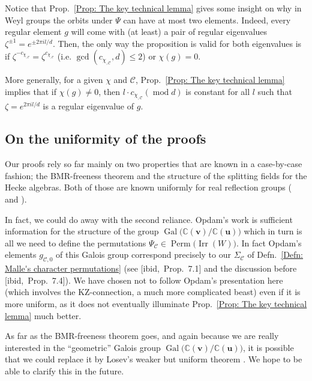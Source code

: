 \documentclass[ALCO, Unicode]{cedram}
\newcommand{\op}[1]{\operatorname{#1}}
\newcommand{\CC}{\mathbb{C}}
\newcommand{\op}[1]{\operatorname{#1}}
\begin{document}
\begin{rema}
Notice that Prop.~\ref{Prop: The key technical lemma} gives some insight on why in Weyl groups the orbits under $\Psi$ can have at most two elements. Indeed, every regular element $g$ will come with (at least) a pair of regular eigenvalues $\zeta^{\pm 1}=e^{\pm2\pi il/d}$. Then, the only way the proposition is valid for both eigenvalues is if $\zeta^{-c_{\chi_{,\mathcal{C}}}}=\zeta^{c_{\chi_{,\mathcal{C}}}}$ (i.e. $\op{gcd}(c_{\chi_{,\mathcal{C}}},d)\leq 2$) or $\chi(g)=0$.

More generally, for a given $\chi$ and $\mathcal{C}$, Prop.~\ref{Prop: The key technical lemma} implies that if $\chi(g)\neq 0$, then $l\cdot c_{\chi_{,\mathcal{C}}}(\op{mod} d)$ is constant for all $l$ such that $\zeta=e^{2\pi i l/d}$ is a regular eigenvalue of $g$.
\end{rema}


\subsection{On the uniformity of the proofs}
\label{Section: On the uniformity of the proofs}

Our proofs rely so far mainly on two properties that are known in a case-by-case fashion; the BMR-freeness theorem and the structure of the splitting fields for the Hecke algebras. Both of those are known uniformly for real reflection groups (\cite[Thm.~4.4.6]{geck-pfeiffer-book} and \cite[Thm.~5]{opdam-remark-on-irr-characters}).

In fact, we could do away with the second reliance. Opdam's work \cite[Thm.~6.7]{opdam-fake-degrees-arxiv} is sufficient information for the structure of the group $\op{Gal}\big(\CC(\bm v)/\CC(\bm u)\big)$ which in turn is all we need to define the permutations $\Psi_{\mathcal{C}}\in\op{Perm}\big( \op{Irr}(W)\big)$. In fact Opdam's elements $g_{\mathcal{C},0}$ of this Galois group correspond precisely to our $\Sigma_{\mathcal{C}}$ of Defn.~\ref{Defn: Malle's character permutations} (see [ibid,~Prop.~7.1] and the discussion before [ibid,~Prop.~7.4]). We have chosen not to follow Opdam's presentation here (which involves the KZ-connection, a much more complicated beast) even if it is more uniform, as it does not eventually illuminate Prop.~\ref{Prop: The key technical lemma} much better. 

As far as the BMR-freeness theorem goes, and again because we are really interested in the ``geometric'' Galois group $\op{Gal}\big(\CC(\bm v)/\CC(\bm u)\big)$, it is possible that we could replace it by Losev's weaker but uniform theorem \cite{losev-finite-dim-quotients}. We hope to be able to clarify this in the future.
\end{document}
